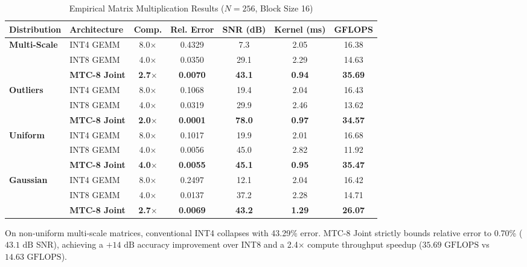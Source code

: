 \documentclass[11pt,a4paper]{article}
\begin{document}
\begin{table}[ht]
\centering
\small
\caption{Empirical Matrix Multiplication Results ($N=256$, Block Size 16)}
\label{tab:gemm}
\begin{tabular}{llccccc}
\toprule
\textbf{Distribution} & \textbf{Architecture} & \textbf{Comp.} & \textbf{Rel. Error} & \textbf{SNR (dB)} & \textbf{Kernel (ms)} & \textbf{GFLOPS} \\
\midrule
\textbf{Multi-Scale} & INT4 GEMM & 8.0$\times$ & 0.4329 & 7.3 & 2.05 & 16.38 \\
& INT8 GEMM & 4.0$\times$ & 0.0350 & 29.1 & 2.29 & 14.63 \\
& \textbf{MTC-8 Joint} & \textbf{2.7$\times$} & \textbf{0.0070} & \textbf{43.1} & \textbf{0.94} & \textbf{35.69} \\
\midrule
\textbf{Outliers} & INT4 GEMM & 8.0$\times$ & 0.1068 & 19.4 & 2.04 & 16.43 \\
& INT8 GEMM & 4.0$\times$ & 0.0319 & 29.9 & 2.46 & 13.62 \\
& \textbf{MTC-8 Joint} & \textbf{2.0$\times$} & \textbf{0.0001} & \textbf{78.0} & \textbf{0.97} & \textbf{34.57} \\
\midrule
\textbf{Uniform} & INT4 GEMM & 8.0$\times$ & 0.1017 & 19.9 & 2.01 & 16.68 \\
& INT8 GEMM & 4.0$\times$ & 0.0056 & 45.0 & 2.82 & 11.92 \\
& \textbf{MTC-8 Joint} & \textbf{4.0$\times$} & \textbf{0.0055} & \textbf{45.1} & \textbf{0.95} & \textbf{35.47} \\
\midrule
\textbf{Gaussian} & INT4 GEMM & 8.0$\times$ & 0.2497 & 12.1 & 2.04 & 16.42 \\
& INT8 GEMM & 4.0$\times$ & 0.0137 & 37.2 & 2.28 & 14.71 \\
& \textbf{MTC-8 Joint} & \textbf{2.7$\times$} & \textbf{0.0069} & \textbf{43.2} & \textbf{1.29} & \textbf{26.07} \\
\bottomrule
\end{tabular}
\end{table}

On non-uniform multi-scale matrices, conventional INT4 collapses with 43.29\% error. MTC-8 Joint strictly bounds relative error to 0.70\% ($43.1\text{ dB}$ SNR), achieving a $+14\text{ dB}$ accuracy improvement over INT8 and a 2.4$\times$ compute throughput speedup ($35.69\text{ GFLOPS}$ vs $14.63\text{ GFLOPS}$).
\end{document}
